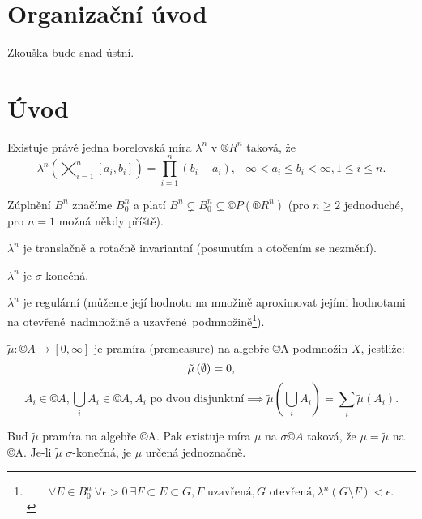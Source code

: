 \documentclass[12pt]{article}					%
\begin{document}

\section*{Organizační úvod}
	\begin{poznamka}
		Zkouška bude snad ústní.
	\end{poznamka}

\section*{Úvod}
\begin{veta}
	Existuje právě jedna borelovská míra $\lambda^n$ v $®R^n$ taková, že
	$$ \lambda^n\left(\bigtimes_{i=1}^n[a_i, b_i]\right) = \prod_{i=1}^n \left(b_i - a_i\right), -∞ < a_i ≤ b_i < ∞, 1 ≤ i ≤ n. $$

	\begin{poznamkain}
		Zúplnění $B^n$ značíme $B_0^n$ a platí $B^n \subsetneq B_0^n \subsetneq ©P(®R^n)$ (pro $n ≥ 2$ jednoduché, pro $n = 1$ možná někdy příště).

		$\lambda^n$ je translačně a rotačně invariantní (posunutím a otočením se nezmění).

		$\lambda^n$ je $\sigma$-konečná.

		$\lambda^n$ je regulární (můžeme její hodnotu na množině aproximovat jejími hodnotami na otevřené nadmnožině a uzavřené podmnožině\footnote{$$ \forall E \in B_0^n\ \forall \epsilon > 0\ \exists F \subset E \subset G, F\text{ uzavřená}, G\text{ otevřená}, \lambda^n\left(G \setminus F \right) < \epsilon.  $$}).
	\end{poznamkain}
\end{veta}

\begin{definice}[Pramíra]
	$\tilde{\mu}: ©A \rightarrow [0, ∞]$ je pramíra (premeasure) na algebře ©A podmnožin $X$, jestliže:
	$$ \tilde{\mu}\left(\emptyset\right) = 0, $$
	$$ A_i \in ©A, \bigcup_i A_i \in ©A, A_i \text{ po dvou disjunktní} \implies \tilde{\mu}\left(\bigcup_iA_i\right) = \sum_i \tilde{\mu}\left(A_i\right). $$
\end{definice}

\begin{veta}
	Buď $\tilde{\mu}$ pramíra na algebře ©A. Pak existuje míra $\mu$ na $\sigma ©A$ taková, že $\mu = \tilde{\mu}$ na ©A. Je-li $\tilde{\mu}$ $\sigma$-konečná, je $\mu$ určená jednoznačně.
\end{veta}
\end{document}
